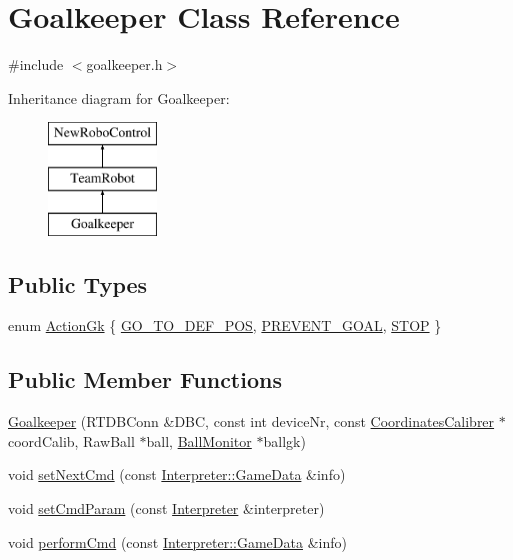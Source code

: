 \hypertarget{classGoalkeeper}{
\section{Goalkeeper Class Reference}
\label{classGoalkeeper}
}


{\ttfamily \#include $<$goalkeeper.h$>$}

Inheritance diagram for Goalkeeper:\begin{figure}[H]
\begin{center}
\leavevmode
\includegraphics[height=3cm]{classGoalkeeper}
\end{center}
\end{figure}
\subsection*{Public Types}
\begin{DoxyCompactItemize}
\item 
enum \hyperlink{classGoalkeeper_a25db0bed632b4bdb87532b0fbbf45855}{ActionGk} \{ \hyperlink{classGoalkeeper_a25db0bed632b4bdb87532b0fbbf45855af1fa8ff07676a5e27f9cc78f6811c704}{GO\_\-TO\_\-DEF\_\-POS}, 
\hyperlink{classGoalkeeper_a25db0bed632b4bdb87532b0fbbf45855a96b7bc8aa3f3a4d1b68955f8d757e9c1}{PREVENT\_\-GOAL}, 
\hyperlink{classGoalkeeper_a25db0bed632b4bdb87532b0fbbf45855a7940a4d0074c5f5bb33743797387c2c1}{STOP}
 \}
\end{DoxyCompactItemize}
\subsection*{Public Member Functions}
\begin{DoxyCompactItemize}
\item 
\hyperlink{classGoalkeeper_a7ad214162340c37a695ba00d4576c3c4}{Goalkeeper} (RTDBConn \&DBC, const int deviceNr, const \hyperlink{classCoordinatesCalibrer}{CoordinatesCalibrer} $\ast$coordCalib, RawBall $\ast$ball, \hyperlink{classBallMonitor}{BallMonitor} $\ast$ballgk)
\item 
void \hyperlink{classGoalkeeper_abc394351f7c0d552c6e96da422c772ec}{setNextCmd} (const \hyperlink{structInterpreter_1_1GameData}{Interpreter::GameData} \&info)
\item 
void \hyperlink{classGoalkeeper_acfa6fbad0f6b1627fd59cc7cce6ff321}{setCmdParam} (const \hyperlink{classInterpreter}{Interpreter} \&interpreter)
\item 
void \hyperlink{classGoalkeeper_ab850d0d2278730bebc5479f1a339a925}{performCmd} (const \hyperlink{structInterpreter_1_1GameData}{Interpreter::GameData} \&info)
\end{DoxyCompactItemize}
